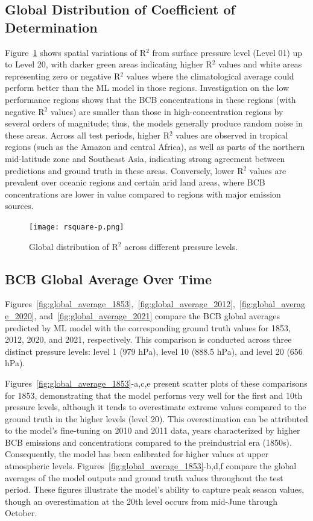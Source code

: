 \documentclass{article}
\begin{document}
    \subsection{Global Distribution of Coefficient of Determination}
    Figure~\ref{fig:rsquare} shows spatial variations of R$^2$ from surface pressure level (Level 01) up to Level 20, with darker green areas indicating higher R$^2$ values and white areas representing zero or negative R$^2$ values where the climatological average could perform better than the ML model in those regions. Investigation on the low performance regions shows that the BCB concentrations in these regions (with negative R$^2$ values) are smaller than those in high-concentration regions by several orders of magnitude; thus, the models generally produce random noise in these areas. 
    Across all test periods, higher R$^2$ values are observed in tropical regions (such as the Amazon and central Africa), as well as parts of the northern mid-latitude zone and Southeast Asia, indicating strong agreement between predictions and ground truth in these areas. Conversely, lower R$^2$ values are prevalent over oceanic regions and certain arid land areas, where BCB concentrations are lower in value compared to regions with major emission sources. 
    
    \begin{figure}[htbp]
        \centering
        \texttt{[image: rsquare-p.png]}
        \caption{Global distribution of R$^2$ across different pressure levels.}
        \label{fig:rsquare}
    \end{figure}

    \subsection{BCB Global Average Over Time}
    Figures~\ref{fig:global_average_1853},~\ref{fig:global_average_2012},~\ref{fig:global_average_2020}, and~\ref{fig:global_average_2021} compare the BCB global averages predicted by ML model with the corresponding ground truth values for 1853, 2012, 2020, and 2021, respectively. This comparison is conducted across three distinct pressure levels: level 1 (979 hPa), level 10 (888.5 hPa), and level 20 (656 hPa).
    
    Figures~\ref{fig:global_average_1853}-a,c,e present scatter plots of these comparisons for 1853, demonstrating that the model performs very well for the first and 10th pressure levels, although it tends to overestimate extreme values compared to the ground truth in the higher levels (level 20). This overestimation can be attributed to the model's fine-tuning on 2010 and 2011 data, years characterized by higher BCB emissions and concentrations compared to the preindustrial era (1850s). Consequently, the model has been calibrated for higher values at upper atmospheric levels. Figures~\ref{fig:global_average_1853}-b,d,f compare the global averages of the model outputs and ground truth values throughout the test period. These figures illustrate the model's ability to capture peak season values, though an overestimation at the 20th level occurs from mid-June through October.
    
\end{document}
